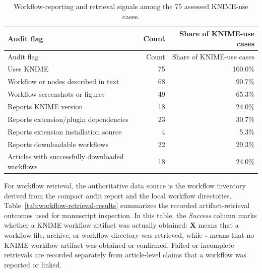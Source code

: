 \documentclass[runningheads]{llncs}
\begin{document}
\begingroup
\scriptsize
\renewcommand{\arraystretch}{1.18}
\begin{longtable}{|%
  >{\raggedright\arraybackslash}p{}|
  r|
  r|}
\caption{Workflow-reporting and retrieval signals among the 75 assessed KNIME-use cases.}
\label{tab:knime-use-assessment}\\
\toprule
Audit flag & Count & Share of KNIME-use cases \\
\midrule
\endfirsthead
\toprule
Audit flag & Count & Share of KNIME-use cases \\
\midrule
\endhead
\bottomrule
\endfoot
Uses KNIME & 75 & 100.0\% \\
Workflow or nodes described in text & 68 & 90.7\% \\
Workflow screenshots or figures & 49 & 65.3\% \\
Reports KNIME version & 18 & 24.0\% \\
Reports extension/plugin dependencies & 23 & 30.7\% \\
Reports extension installation source & 4 & 5.3\% \\
Reports downloadable workflows & 22 & 29.3\% \\
Articles with successfully downloaded workflows & 18 & 24.0\% \\
\end{longtable}
\endgroup

For workflow retrieval, the authoritative data source is the workflow inventory
derived from the compact audit report and the local workflow directories.
Table~\ref{tab:workflow-retrieval-results} summarizes the recorded
artifact-retrieval outcomes used for manuscript inspection. In this table, the
\emph{Success} column marks whether a KNIME workflow artifact was actually
obtained: \textbf{X} means that a workflow file, archive, or workflow directory
was retrieved, while \textbf{-} means that no KNIME workflow artifact was
obtained or confirmed. Failed or incomplete retrievals are recorded separately
from article-level claims that a workflow was reported or linked.
\end{document}
